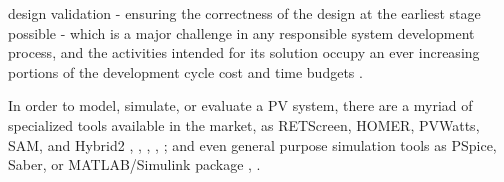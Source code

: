 \documentclass[journal]{IEEEtran}
\begin{document}
%
design validation - ensuring the correctness of the design at the earliest stage possible - which is a major challenge in any responsible system development process, and the activities intended for its solution occupy an ever increasing portions of the  development cycle cost and time budgets \cite{ClarkeHV18}. 

In order to model, simulate, or evaluate a PV system, there are a myriad of specialized tools available in the market, as RETScreen, HOMER, PVWatts, SAM, and Hybrid2 \cite{Pradhan}, \cite{Swarnkar}, \cite{NRELDobos}, \cite{NRELBlair}, \cite{Mills}; and even general purpose simulation tools as PSpice, Saber, or MATLAB/Simulink package \cite{Gow1999}, \cite{Benatiallah2017}.
\end{document}
